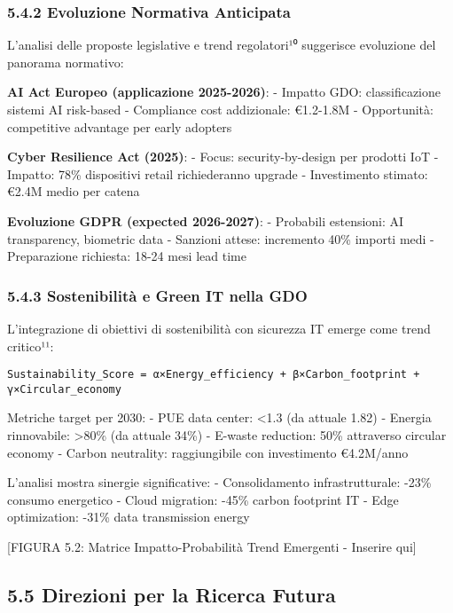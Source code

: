 \documentclass{report}
\begin{document}
\subsubsection{5.4.2 Evoluzione Normativa
Anticipata}\label{evoluzione-normativa-anticipata}

L'analisi delle proposte legislative e trend regolatori¹⁰ suggerisce
evoluzione del panorama normativo:

\textbf{AI Act Europeo (applicazione 2025-2026)}: - Impatto GDO:
classificazione sistemi AI risk-based - Compliance cost addizionale:
€1.2-1.8M - Opportunità: competitive advantage per early adopters

\textbf{Cyber Resilience Act (2025)}: - Focus: security-by-design per
prodotti IoT - Impatto: 78\% dispositivi retail richiederanno upgrade -
Investimento stimato: €2.4M medio per catena

\textbf{Evoluzione GDPR (expected 2026-2027)}: - Probabili estensioni:
AI transparency, biometric data - Sanzioni attese: incremento 40\%
importi medi - Preparazione richiesta: 18-24 mesi lead time

\subsubsection{5.4.3 Sostenibilità e Green IT nella
GDO}\label{sostenibilituxe0-e-green-it-nella-gdo}

L'integrazione di obiettivi di sostenibilità con sicurezza IT emerge
come trend critico¹¹:

\begin{verbatim}
Sustainability_Score = α×Energy_efficiency + β×Carbon_footprint + γ×Circular_economy
\end{verbatim}

Metriche target per 2030: - PUE data center: \textless1.3 (da attuale
1.82) - Energia rinnovabile: \textgreater80\% (da attuale 34\%) -
E-waste reduction: 50\% attraverso circular economy - Carbon neutrality:
raggiungibile con investimento €4.2M/anno

L'analisi mostra sinergie significative: - Consolidamento
infrastrutturale: -23\% consumo energetico - Cloud migration: -45\%
carbon footprint IT - Edge optimization: -31\% data transmission energy

{[}FIGURA 5.2: Matrice Impatto-Probabilità Trend Emergenti - Inserire
qui{]}

\subsection{5.5 Direzioni per la Ricerca
Futura}\label{direzioni-per-la-ricerca-futura}
\end{document}

